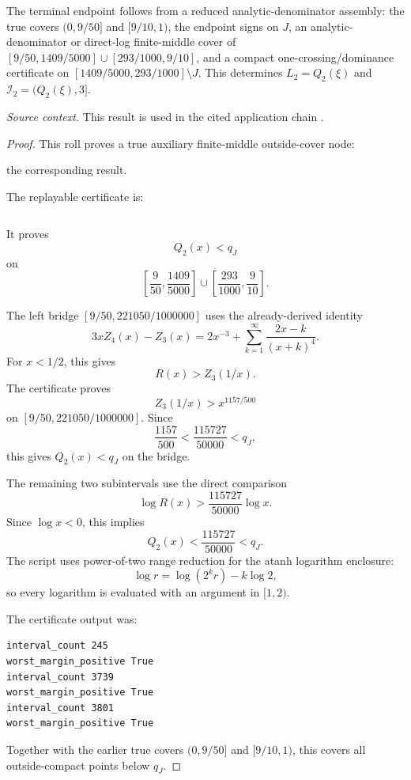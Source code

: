 \begin{proposition}
\label{res:q2-analytic-denominator-reduced-assembly-terminal-certificate}
The terminal endpoint follows from a reduced analytic-denominator assembly: the true covers \((0,9/50]\) and \([9/10,1)\), the endpoint signs on \(J\), an analytic-denominator or direct-log finite-middle cover of \([9/50,1409/5000]\cup[293/1000,9/10]\), and a compact one-crossing/dominance certificate on \([1409/5000,293/1000]\setminus J\). This determines \(L_2=Q_2(\xi)\) and \(\mathcal I_2=(Q_2(\xi),3]\).

\emph{Source context.} This result is used in the cited application chain \cite{app-app-0004-source}.
\end{proposition}
\begin{proof}
This roll proves a true auxiliary finite-middle outside-cover node:

the corresponding result.

The replayable certificate is:

\begin{verbatim}
\end{verbatim}

It proves
\[
Q_2(x)<q_J
\]
on
\[
\left[\frac9{50},\frac{1409}{5000}\right]
\cup
\left[\frac{293}{1000},\frac9{10}\right].
\]

The left bridge \([9/50,221050/1000000]\) uses the already-derived identity
\[
3xZ_4(x)-Z_3(x)
=2x^{-3}+\sum_{k=1}^{\infty}\frac{2x-k}{(x+k)^4}.
\]
For \(x<1/2\), this gives
\[
R(x)>Z_3(1/x).
\]
The certificate proves
\[
Z_3(1/x)>x^{1157/500}
\]
on \([9/50,221050/1000000]\). Since
\[
\frac{1157}{500}<\frac{115727}{50000}<q_J,
\]
this gives \(Q_2(x)<q_J\) on the bridge.

The remaining two subintervals use the direct comparison
\[
\log R(x)>\frac{115727}{50000}\log x.
\]
Since \(\log x<0\), this implies
\[
Q_2(x)<\frac{115727}{50000}<q_J.
\]
The script uses power-of-two range reduction for the atanh logarithm enclosure:
\[
\log r=\log(2^k r)-k\log 2,
\]
so every logarithm is evaluated with an argument in \([1,2)\).

The certificate output was:

\begin{verbatim}
interval_count 245
worst_margin_positive True
interval_count 3739
worst_margin_positive True
interval_count 3801
worst_margin_positive True
\end{verbatim}

Together with the earlier true covers \((0,9/50]\) and \([9/10,1)\), this covers all outside-compact points below \(q_J\).


\end{proof}
